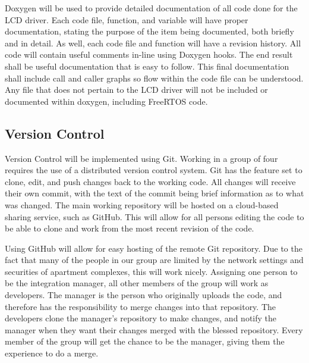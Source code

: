 Doxygen will be used to provide detailed documentation of all code done for the L\-C\-D driver. Each code file, function, and variable will have proper documentation, stating the purpose of the item being documented, both briefly and in detail. As well, each code file and function will have a revision history. All code will contain useful comments in-\/line using Doxygen hooks. The end result shall be useful documentation that is easy to follow. This final documentation shall include call and caller graphs so flow within the code file can be understood. Any file that does not pertain to the L\-C\-D driver will not be included or documented within doxygen, including Free\-R\-T\-O\-S code.\hypertarget{index_version}{}\subsection{Version Control}\label{index_version}
Version Control will be implemented using Git. Working in a group of four requires the use of a distributed version control system. Git has the feature set to clone, edit, and push changes back to the working code. All changes will receive their own commit, with the text of the commit being brief information as to what was changed. The main working repository will be hosted on a cloud-\/based sharing service, such as Git\-Hub. This will allow for all persons editing the code to be able to clone and work from the most recent revision of the code.

Using Git\-Hub will allow for easy hosting of the remote Git repository. Due to the fact that many of the people in our group are limited by the network settings and securities of apartment complexes, this will work nicely. Assigning one person to be the integration manager, all other members of the group will work as developers. The manager is the person who originally uploads the code, and therefore has the responsibility to merge changes into that repository. The developers clone the manager’s repository to make changes, and notify the manager when they want their changes merged with the blessed repository. Every member of the group will get the chance to be the manager, giving them the experience to do a merge. 